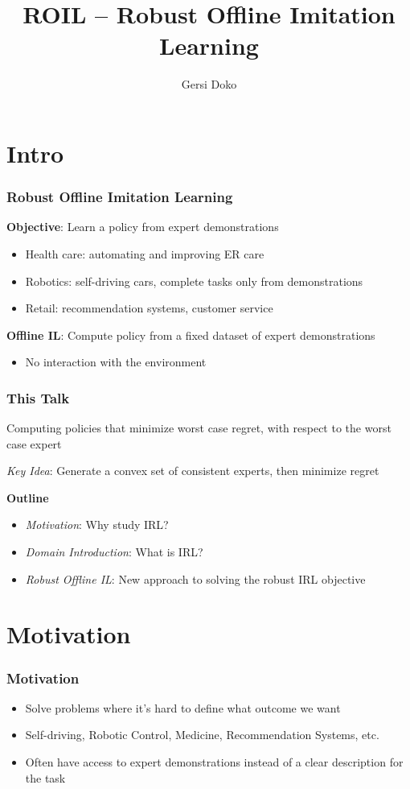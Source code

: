 \documentclass{beamer}
\title{ROIL -- Robust Offline Imitation Learning}
\author{Gersi Doko}
\institute{Department of Computer Science \\ University of New Hampshire}
\begin{document}
\frame{\titlepage}

\section*{Intro}

\begin{frame}
	\frametitle{Robust Offline Imitation Learning}
	\textbf{Objective}: Learn a policy from expert demonstrations
	\begin{itemize}
	\item Health care: automating and improving ER care
	\item Robotics: self-driving cars, complete tasks only from demonstrations
	\item Retail: recommendation systems, customer service
	
	\end{itemize}
	\vfill
	\textbf{Offline IL}: Compute policy from a fixed dataset of expert demonstrations
	\begin{itemize}
		\item No interaction with the environment
	\end{itemize}
\end{frame}

\begin{frame}
	\frametitle{This Talk}
	Computing policies that minimize worst case regret, with respect to the worst case expert

	\vfill
	\emph{Key Idea}: Generate a convex set of consistent experts, then minimize regret

	\textbf{Outline}
	\begin{itemize}
	\item \emph{Motivation}: Why study IRL?
	\item \emph{Domain Introduction}: What is IRL?
	\item \emph{Robust Offline IL}: New approach to solving the robust IRL objective
	\end{itemize}
\end{frame}

\section*{Motivation}

\begin{frame}
\frametitle{Motivation}
	\begin{itemize}
		\item Solve problems where it's hard to define what outcome we want
		\item Self-driving, Robotic Control, Medicine, Recommendation Systems, etc.
		\item Often have access to expert demonstrations instead of a clear description for the task
	\end{itemize}
\end{frame}
\end{document}
